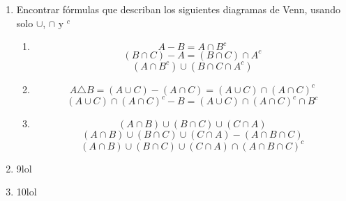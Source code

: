 \documentclass[../practica.root.tex]{subfiles}
\begin{document}
\begin{enumerate}
    \item Encontrar fórmulas que describan los siguientes diagramas de Venn, usando solo $\cup$, $\cap$ y $^c$
          \begin{enumerate}
              \item
                    \[ A - B = A \cap B^c \]
                    \[ (B \cap C) - A = (B \cap C) \cap A^c \]
                    \[ \boxed{(A \cap B^c) \cup (B \cap C \cap A^c)} \]
              \item
                    \[ A \triangle B = (A \cup C) - (A \cap C) = (A \cup C) \cap (A \cap C)^c \]
                    \[ (A \cup C) \cap (A \cap C)^c - B = \boxed{(A \cup C) \cap (A \cap C)^c \cap B^c} \]
              \item
                    \[ (A \cap B) \cup (B \cap C) \cup (C \cap A) \]
                    \[ (A \cap B) \cup (B \cap C) \cup (C \cap A) - (A \cap B \cap C) \]
                    \[ \boxed{(A \cap B) \cup (B \cap C) \cup (C \cap A) \cap (A \cap B \cap C)^c} \]
          \end{enumerate}

    \item 9lol

    \item 10lol

\end{enumerate}
\end{document}
